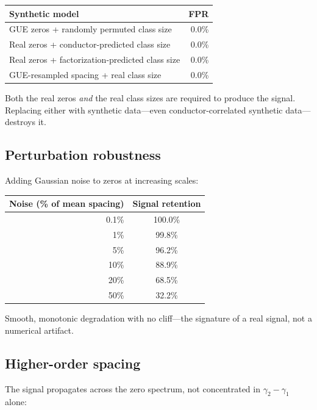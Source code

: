 \documentclass[11pt,a4paper]{article}
\begin{document}
\begin{center}
\begin{tabular}{lr}
\toprule
\textbf{Synthetic model} & \textbf{FPR} \\
\midrule
GUE zeros + randomly permuted class size & 0.0\% \\
Real zeros + conductor-predicted class size & 0.0\% \\
Real zeros + factorization-predicted class size & 0.0\% \\
GUE-resampled spacing + real class size & 0.0\% \\
\bottomrule
\end{tabular}
\end{center}

Both the real zeros \emph{and} the real class sizes are required to produce the signal. Replacing either with synthetic data---even conductor-correlated synthetic data---destroys it.

\subsection{Perturbation robustness}

Adding Gaussian noise to zeros at increasing scales:

\begin{center}
\begin{tabular}{rc}
\toprule
\textbf{Noise (\% of mean spacing)} & \textbf{Signal retention} \\
\midrule
0.1\% & 100.0\% \\
1\% & 99.8\% \\
5\% & 96.2\% \\
10\% & 88.9\% \\
20\% & 68.5\% \\
50\% & 32.2\% \\
\bottomrule
\end{tabular}
\end{center}

Smooth, monotonic degradation with no cliff---the signature of a real signal, not a numerical artifact.

\subsection{Higher-order spacing}

The signal propagates across the zero spectrum, not concentrated in $\gamma_2 - \gamma_1$ alone:
\end{document}
